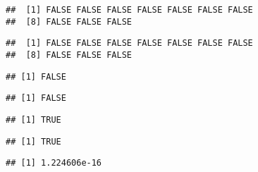 \documentclass[paper=a4,headsepline,BCOR=12mm,twoside,open=right,%
titlepage,headings=small,fontsize=10pt,index=totoc,bibliography=totoc,%
captions=tableheading,captions=nooneline]{scrbook}\usepackage{knitr}
\begin{document}
\begin{knitrout}\footnotesize
{}\color{fgcolor}\begin{kframe}
\begin{alltt}
 \hlopt{==}  
\end{alltt}
\begin{verbatim}
##  [1] FALSE FALSE FALSE FALSE FALSE FALSE FALSE
##  [8] FALSE FALSE FALSE
\end{verbatim}
\begin{alltt}
 \hlopt{<}  
\end{alltt}
\begin{verbatim}
##  [1] FALSE FALSE FALSE FALSE FALSE FALSE FALSE
##  [8] FALSE FALSE FALSE
\end{verbatim}
\begin{alltt}
 \hlopt{==}  
\end{alltt}
\begin{verbatim}
## [1] FALSE
\end{verbatim}
\begin{alltt}
\hlstd{(} \hlopt{*}  \hlopt{==} 
\end{alltt}
\begin{verbatim}
## [1] FALSE
\end{verbatim}
\begin{alltt}
\hlstd{(} \hlopt{<} 
\end{alltt}
\begin{verbatim}
## [1] TRUE
\end{verbatim}
\begin{alltt}
\hlstd{(}\hlstd{(} \hlopt{*}  \hlopt{<} 
\end{alltt}
\begin{verbatim}
## [1] TRUE
\end{verbatim}
\begin{alltt}
\end{alltt}
\begin{verbatim}
## [1] 1.224606e-16
\end{verbatim}
\begin{alltt}
\hlstd{(} \hlopt{*} 
\end{alltt}
\begin{verbatim}

\end{verbatim}
\end{kframe}
\end{knitrout}
\end{document}
